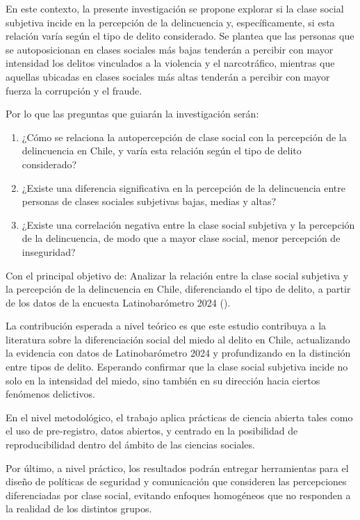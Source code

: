 \documentclass[
  spanish,
  a4paper,
  oneside]{scrbook}
\begin{document}
En este contexto, la presente investigación se propone explorar si la
clase social subjetiva incide en la percepción de la delincuencia y,
específicamente, si esta relación varía según el tipo de delito
considerado. Se plantea que las personas que se autoposicionan en clases
sociales más bajas tenderán a percibir con mayor intensidad los delitos
vinculados a la violencia y el narcotráfico, mientras que aquellas
ubicadas en clases sociales más altas tenderán a percibir con mayor
fuerza la corrupción y el fraude.

Por lo que las preguntas que guiarán la investigación serán:

\begin{enumerate}
\def\labelenumi{\arabic{enumi}.}
\item
  ¿Cómo se relaciona la autopercepción de clase social con la percepción
  de la delincuencia en Chile, y varía esta relación según el tipo de
  delito considerado?
\item
  ¿Existe una diferencia significativa en la percepción de la
  delincuencia entre personas de clases sociales subjetivas bajas,
  medias y altas?
\item
  ¿Existe una correlación negativa entre la clase social subjetiva y la
  percepción de la delincuencia, de modo que a mayor clase social, menor
  percepción de inseguridad?
\end{enumerate}

Con el principal objetivo de: Analizar la relación entre la clase social
subjetiva y la percepción de la delincuencia en Chile, diferenciando el
tipo de delito, a partir de los datos de la encuesta Latinobarómetro
2024 ().

La contribución esperada a nivel teórico es que este estudio contribuya
a la literatura sobre la diferenciación social del miedo al delito en
Chile, actualizando la evidencia con datos de Latinobarómetro 2024 y
profundizando en la distinción entre tipos de delito. Esperando
confirmar que la clase social subjetiva incide no solo en la intensidad
del miedo, sino también en su dirección hacia ciertos fenómenos
delictivos.

En el nivel metodológico, el trabajo aplica prácticas de ciencia abierta
tales como el uso de pre-registro, datos abiertos, y centrado en la
posibilidad de reproducibilidad dentro del ámbito de las ciencias
sociales.

Por último, a nivel práctico, los resultados podrán entregar
herramientas para el diseño de políticas de seguridad y comunicación que
consideren las percepciones diferenciadas por clase social, evitando
enfoques homogéneos que no responden a la realidad de los distintos
grupos.
\end{document}
